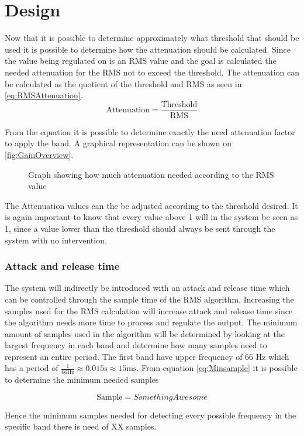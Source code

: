 \section{Design}
Now that it is possible to determine approximately what threshold that should be used it is possible to determine how the attenuation should be calculated. Since the value being regulated on is an RMS value and the goal is calculated the needed attenuation for the RMS not to exceed the threshold. The attenuation can be calculated as the quotient of the threshold and RMS as seen in \autoref{eq:RMSAttenuation}.
\begin{equation}\label{eq:RMSAttenuation}
\text{Attenuation} = \frac{\text{Threshold}}{\text{RMS}}
\end{equation}

From the equation it is possible to determine exactly the need attenuation factor to apply the band. A graphical representation can be shown on \autoref{fig:GainOverview}.

\begin{figure}[H]
\centering
{}

\caption{Graph showing how much attenuation needed according to the RMS value}
\label{fig:GainOverview}
\end{figure}

The Attenuation values can the be adjusted according to the threshold desired. It is again important to know that every value above 1 will in the system be seen as 1, since a value lower than the threshold should always be sent through the system with no intervention.  


\subsubsection{Attack and release time}
The system will indirectly be introduced with an attack and release time which can be controlled through the sample time of the RMS algorithm. Increasing the samples used for the RMS calculation will increase attack and release time since the algorithm needs more time to process and regulate the output. The minimum amount of samples used in the algorithm will be determined by looking at the largest frequency in each band and determine how many samples need to represent an entire period. The first band have upper frequency of 66 Hz which has a period of $\frac{1}{66 \text{Hz}} \approx 0.015 \text{s} \approx 15 \text{ms}$. From equation \ref{eq:Minsample} it is possible to determine the minimum needed samples

\begin{equation}\label{eq:Minsample}
\text{Sample}= Something Awesome
\end{equation} 

Hence the minimum samples needed for detecting every possible frequency in the specific band there is need of XX samples.


